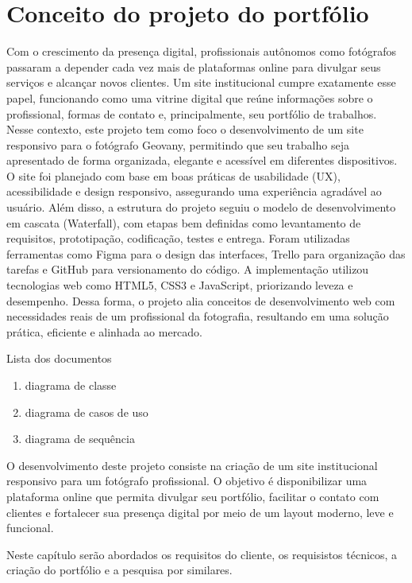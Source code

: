 \chapter{Conceito do projeto do portfólio}
\label{chap:fundteor}
Com o crescimento da presença digital, profissionais autônomos como fotógrafos passaram a depender cada vez mais de plataformas online para divulgar seus serviços e alcançar novos clientes. Um site institucional cumpre exatamente esse papel, funcionando como uma vitrine digital que reúne informações sobre o profissional, formas de contato e, principalmente, seu portfólio de trabalhos. Nesse contexto, este projeto tem como foco o desenvolvimento de um site responsivo para o fotógrafo Geovany, permitindo que seu trabalho seja apresentado de forma organizada, elegante e acessível em diferentes dispositivos. O site foi planejado com base em boas práticas de usabilidade (UX), acessibilidade e design responsivo, assegurando uma experiência agradável ao usuário. Além disso, a estrutura do projeto seguiu o modelo de desenvolvimento em cascata (Waterfall), com etapas bem definidas como levantamento de requisitos, prototipação, codificação, testes e entrega. Foram utilizadas ferramentas como Figma para o design das interfaces, Trello para organização das tarefas e GitHub para versionamento do código. A implementação utilizou tecnologias web como HTML5, CSS3 e JavaScript, priorizando leveza e desempenho. Dessa forma, o projeto alia conceitos de desenvolvimento web com necessidades reais de um profissional da fotografia, resultando em uma solução prática, eficiente e alinhada ao mercado.

Lista dos documentos
\begin{enumerate}
   \item diagrama de classe
   \item diagrama de casos de uso
   \item diagrama de sequência
\end{enumerate}

O desenvolvimento deste projeto consiste na criação de um site institucional responsivo para um fotógrafo profissional. O objetivo é disponibilizar uma plataforma online que permita divulgar seu portfólio, facilitar o contato com clientes e fortalecer sua presença digital por meio de um layout moderno, leve e funcional.

Neste capítulo serão abordados os requisitos do cliente, os requisistos técnicos, a criação do portfólio e a pesquisa por similares. 



